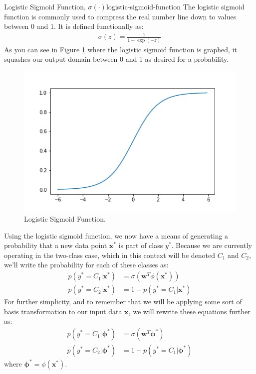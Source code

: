 \begin{definition}{Logistic Sigmoid Function, $\sigma(\cdot)$}{logistic-sigmoid-function}
	The logistic sigmoid function is commonly used to compress the real number line down to values between 0 and 1. It is defined functionally as:
	\begin{align*}
		\sigma(z) = \frac{1}{1 + \exp{(-z)}}
	\end{align*}
	As you can see in Figure \ref{fig:log-sig-fn} where the logistic sigmoid function is graphed, it squashes our output domain between 0 and 1 as desired for a probability.
\end{definition}

\begin{figure}
    \centering
    \includegraphics[width=0.5\paperwidth]{../Classification/fig/log_sig_fn_GEN.jpg}
    \caption{Logistic Sigmoid Function.}
    \label{fig:log-sig-fn}
\end{figure}


Using the logistic sigmoid function, we now have a means of generating a probability that a new data point $\textbf{x}^{*}$ is part of class $y^{*}$. Because we are currently operating in the two-class case, which in this context will be denoted $C_{1}$ and $C_{2}$, we'll write the probability for each of these classes as:
\begin{align*}
	p(y^{*}=C_{1}|\textbf{x}^{*}) &= \sigma(\textbf{w}^{T}\phi{(\textbf{x}^{*})}) \\
	p(y^{*}=C_{2}|\textbf{x}^{*}) &= 1 - p(y^{*}=C_{1}|\textbf{x}^{*})
\end{align*}
For further simplicity, and to remember that we will be applying some sort of basis transformation to our input data $\textbf{x}$, we will rewrite these equations further as:
\begin{align*}
	p(y^{*}=C_{1}|\boldsymbol{\phi}^{*}) &= \sigma(\textbf{w}^{T}\boldsymbol{\phi}^{*}) \\
	p(y^{*}=C_{2}|\boldsymbol{\phi}^{*}) &= 1 - p(y^{*}=C_{1}|\boldsymbol{\phi}^{*})
\end{align*}
where $\boldsymbol{\phi}^{*} = \phi{(\textbf{x}^{*})}$.

